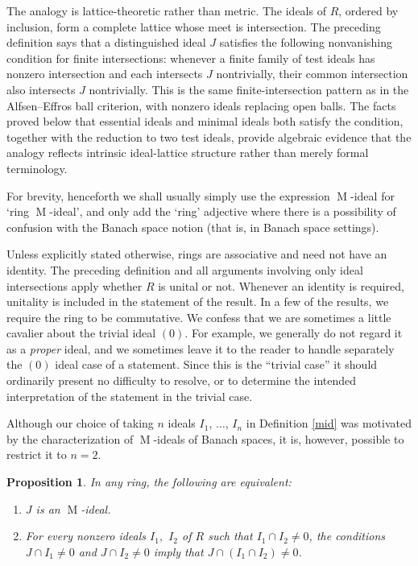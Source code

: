 \documentclass[11pt,leqno]{amsart}
\DeclareMathOperator{\m}{M}
\newtheorem{proposition}[theorem]{Proposition}
\theoremstyle{definition}
\theoremstyle{remark}
\numberwithin{equation}{section}
\numberwithin{equation}{section}
\begin{document}
The analogy is lattice-theoretic rather than metric. The ideals of $R$, ordered by inclusion, form a complete lattice whose meet is intersection. The preceding definition says that a distinguished ideal $J$ satisfies the following nonvanishing condition for finite intersections: whenever a finite family of test ideals has nonzero intersection and each intersects $J$ nontrivially, their common intersection also intersects $J$ nontrivially. This is the same finite-intersection pattern as in the Alfsen--Effros ball criterion, with nonzero ideals replacing open balls. The facts proved below that essential ideals and minimal ideals both satisfy the condition, together with the reduction to two test ideals, provide algebraic evidence that the analogy reflects intrinsic ideal-lattice structure rather than merely formal terminology.

For brevity, henceforth we shall usually simply use the 
expression $\m$-ideal for `ring $\m$-ideal', and only add the `ring' adjective where there is a possibility of confusion with the Banach space notion (that is, in Banach space settings).  

Unless explicitly stated otherwise, rings are associative and need not have an identity. The preceding definition and all arguments involving only ideal intersections 
apply whether $R$ is unital or not. Whenever an identity is required, unitality is included in the statement of the result. In a few of the results, we require the ring to be commutative.   We confess that we are sometimes a little cavalier 
about the trivial ideal $(0)$.   For example, we generally do not regard it as a {\em proper} ideal, and  we sometimes leave it to the reader to handle separately the $(0)$ ideal case of a statement.  Since this is the ``trivial case'' it should ordinarily  present no difficulty to resolve, or to  determine the intended interpretation of the statement in the trivial case.


\bigskip

Although our choice of taking $n$ ideals $I_1$, $\ldots$, $I_n$ in Definition \ref{mid} was motivated by the characterization of $\m$-ideals of Banach spaces, it is, however, possible to restrict it to $n=2$.  
\begin{proposition}
In any ring, the following are equivalent:
\begin{enumerate}
\item $J$ is an $\m$-ideal.
		
\item  For every  nonzero ideals $I_1,$ $I_2$ of $R$ such that $I_1 \cap I_2\neq 0$, the conditions $J\cap I_1 \neq 0$ and $J\cap I_2\neq 0$ imply that $J\cap (I_1 \cap I_2) \neq 0$.
\end{enumerate}
\end{proposition}
\end{document}
